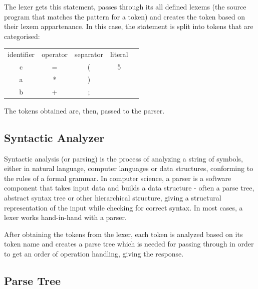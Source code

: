 \documentclass[12pt,a4paper,twoside]{report}
\begin{document}
	The lexer gets this statement, passes through its all defined lexems (the source program that matches the pattern for a token) and creates the token based on their lexem appartenance. In this case, the statement is split into tokens that are categorised:
	\begin{table}[H]
	\centering
\begin{tabular}{|c|c|c|c|l}
\cline{1-4}
\multicolumn{1}{|l|}{identifier} & \multicolumn{1}{l|}{operator} & \multicolumn{1}{l|}{separator} & \multicolumn{1}{l|}{literal} &  \\ \cline{1-4}
c                                & =                             & (                              & 5                            &  \\ \cline{1-4}
a                                & *                             & )                              &                              &  \\ \cline{1-4}
b                                & +                             & ;                              &                              &  \\ \cline{1-4}
\end{tabular}
\end{table}

	The tokens obtained are, then, passed to the parser.
	
\subsection{Syntactic Analyzer}
	Syntactic analysis (or parsing) is the process of analyzing a string of symbols, either in natural language, computer languages or data structures, conforming to the rules of a formal grammar. In computer science, a parser is a software component that takes input data and builds a data structure - often a parse tree, abstract syntax tree or other hierarchical structure, giving a structural representation of the input while checking for correct syntax. In most cases, a lexer works hand-in-hand with a parser.
	
	After obtaining the tokens from the lexer, each token is analyzed based on its token name and creates a parse tree which is needed for passing through in order to get an order of operation handling, giving the response. 
\subsection{Parse Tree}
 	
\end{document}
